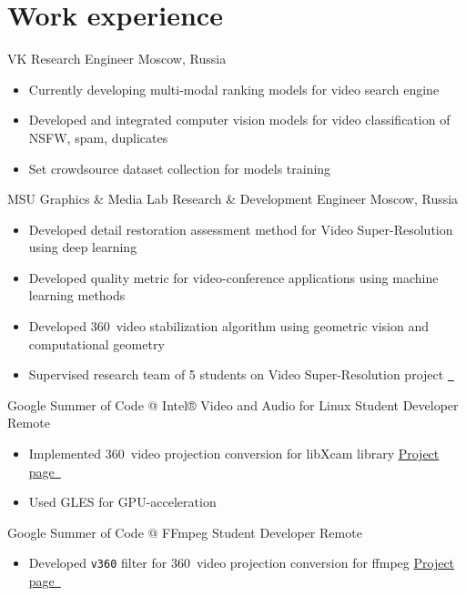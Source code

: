 \documentclass{tccv}
\newcommand{\sphere}{360\textdegree~}
\begin{document}
\section{Work experience}

\begin{eventlist}

     {VK}
     {Research Engineer}
     {Moscow, Russia}
\begin{itemize}
     \item Currently developing multi-modal ranking models for video search engine
     \item Developed and integrated computer vision models for video classification of NSFW, spam, duplicates
     \item Set crowdsource dataset collection for models training
\end{itemize}

     {MSU Graphics \& Media Lab}
     {Research \& Development Engineer}
     {Moscow, Russia}
\begin{itemize}
     \item Developed detail restoration assessment method for Video Super-Resolution using deep learning 
     \item Developed quality metric for video-conference applications using machine learning methods
     \item Developed \sphere video stabilization algorithm using geometric vision and computational geometry
     \item Supervised research team of 5 students on Video Super-Resolution project \href{https://videoprocessing.ai/benchmarks/video-super-resolution.html}{~\faExternalLink*}
\end{itemize}

     {Google Summer of Code @ Intel® Video and Audio for Linux}
     {Student Developer}
     {Remote}
\begin{itemize}
     \item Implemented \sphere video projection conversion for libXcam library\hfill
     \href{https://unishift.github.io/project/2021-08-20-gsoc-libxcam}{Project page~\faExternalLink*}
     \item Used GLES for GPU-acceleration
\end{itemize}

     {Google Summer of Code @ FFmpeg}
     {Student Developer}
     {Remote}
\begin{itemize}
     \item Developed \texttt{v360} filter for \sphere video projection conversion for ffmpeg\hfill
     \href{https://unishift.github.io/project/2019-08-26-gsoc-ffmpeg}{Project page~\faExternalLink*}
\end{itemize}

\end{eventlist}
\end{document}
